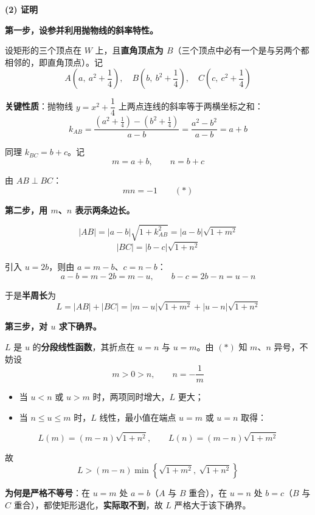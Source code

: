 \begin{answer}
\par\medskip

\textbf{(2) 证明}

\textbf{第一步，设参并利用抛物线的斜率特性。}

设矩形的三个顶点在 $W$ 上，且\textbf{直角顶点为 $B$}（三个顶点中必有一个是与另两个都相邻的，即直角顶点）。记
\nopagebreak[4]
\[A\left(a,\ a^{2}+\frac14\right),\quad B\left(b,\ b^{2}+\frac14\right),\quad C\left(c,\ c^{2}+\frac14\right)\]

\textbf{关键性质}：抛物线 $y=x^{2}+\dfrac14$ 上两点连线的斜率等于两横坐标之和：
\nopagebreak[4]
\[k_{AB}=\frac{\left(a^{2}+\frac14\right)-\left(b^{2}+\frac14\right)}{a-b}=\frac{a^{2}-b^{2}}{a-b}=a+b\]

同理 $k_{BC}=b+c$。记
\nopagebreak[4]
\[m=a+b,\qquad n=b+c\]

由 $AB\perp BC$：
\nopagebreak[4]
\[mn=-1\qquad(\ast)\]

\textbf{第二步，用 $m$、$n$ 表示两条边长。}

\nopagebreak[4]
\[|AB|=|a-b|\sqrt{1+k_{AB}^{2}}=|a-b|\sqrt{1+m^{2}}\]
\nopagebreak[4]
\[|BC|=|b-c|\sqrt{1+n^{2}}\]

引入 $u=2b$，则由 $a=m-b$、$c=n-b$：
\nopagebreak[4]
\[a-b=m-2b=m-u,\qquad b-c=2b-n=u-n\]

于是\textbf{半周长}为
\nopagebreak[4]
\[L=|AB|+|BC|=|m-u|\sqrt{1+m^{2}}+|u-n|\sqrt{1+n^{2}}\]

\textbf{第三步，对 $u$ 求下确界。}

$L$ 是 $u$ 的\textbf{分段线性函数}，其折点在 $u=n$ 与 $u=m$。由 $(\ast)$ 知 $m$、$n$ 异号，不妨设
\nopagebreak[4]
\[m>0>n,\qquad n=-\frac1m\]

\begin{itemize}
\item 当 $u<n$ 或 $u>m$ 时，两项同时增大，$L$ 更大；
\item 当 $n\le u\le m$ 时，$L$ 线性，最小值在端点 $u=m$ 或 $u=n$ 取得：
\end{itemize}

\nopagebreak[4]
\[L(m)=(m-n)\sqrt{1+n^{2}},\qquad L(n)=(m-n)\sqrt{1+m^{2}}\]

故
\nopagebreak[4]
\[L>\left(m-n\right)\min\left\{\sqrt{1+m^{2}},\ \sqrt{1+n^{2}}\right\}\]

\textbf{为何是严格不等号}：在 $u=m$ 处 $a=b$（$A$ 与 $B$ 重合），在 $u=n$ 处 $b=c$（$B$ 与 $C$ 重合），都使矩形退化，\textbf{实际取不到}，故 $L$ 严格大于该下确界。


\end{answer}
